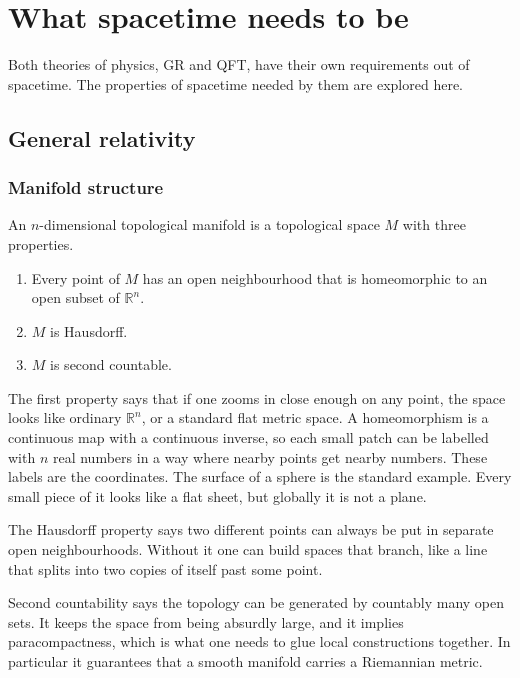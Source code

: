 \section{What spacetime needs to be}
\label{sec:background}

Both theories of physics, GR and QFT, have their own requirements out of spacetime.
The properties of spacetime needed by them are explored here.

\subsection{General relativity}

\subsubsection{Manifold structure}

\begin{definition}
An $n$-dimensional topological manifold is a topological space $M$ with three properties.
\begin{enumerate}
  \item Every point of $M$ has an open neighbourhood that is homeomorphic to an open subset of $\mathbb{R}^n$.
  \item $M$ is Hausdorff.
  \item $M$ is second countable.
\end{enumerate}
\end{definition}

The first property says that if one zooms in close enough on any point, the space looks like ordinary $\mathbb{R}^n$, or a standard flat metric space.
A homeomorphism is a continuous map with a continuous inverse, so each small patch can be labelled with $n$ real numbers in a way where nearby points get nearby numbers.
These labels are the coordinates.
The surface of a sphere is the standard example.
Every small piece of it looks like a flat sheet, but globally it is not a plane.

The Hausdorff property says two different points can always be put in separate open neighbourhoods.
Without it one can build spaces that branch, like a line that splits into two copies of itself past some point.

Second countability says the topology can be generated by countably many open sets.
It keeps the space from being absurdly large, and it implies paracompactness, which is what one needs to glue local constructions together.
In particular it guarantees that a smooth manifold carries a Riemannian metric.

